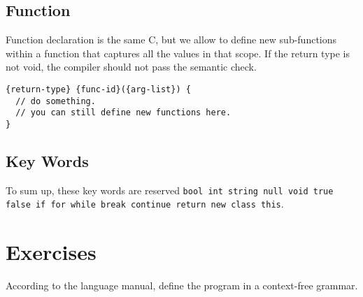\documentclass{article}
\begin{document}
\subsection{Function}

Function declaration is the same C, but we allow to define new sub-functions
within a function that captures all the values in that scope. If the return
type is not void, the compiler should not pass the semantic check.

\begin{lstlisting}[caption=While loop]
{return-type} {func-id}({arg-list}) {
  // do something.
  // you can still define new functions here.
}
\end{lstlisting}

\subsection{Key Words}

To sum up, these key words are reserved \texttt{bool int string null void true false if for while break continue return new class this}.

\section{Exercises}

According to the language manual, define the program in a context-free grammar.
\end{document}
